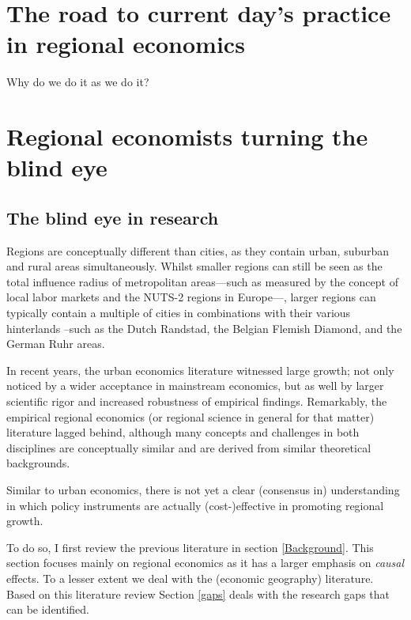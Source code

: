 \documentclass[fleqn,10pt]{SelfArx} %
\begin{document}

\section{The road to current day's practice in regional economics\label{Background}}

Why do we do it as we do it?


\section{Regional economists turning the blind eye\label{practices}}

\subsection{The blind eye in research}

Regions are conceptually different than cities, as they contain urban, suburban and rural areas simultaneously. Whilst smaller regions can still be seen as the total influence radius of metropolitan areas---such as measured by the concept of local labor markets and the NUTS-2 regions in Europe---, larger regions can typically contain a multiple of cities in combinations with their various hinterlands --such as the Dutch Randstad, the Belgian Flemish Diamond, and the German Ruhr areas. 

In recent years, the urban economics literature witnessed large growth; not only noticed by a wider acceptance in mainstream economics, but as well by larger scientific rigor and increased robustness of empirical findings. Remarkably, the empirical regional economics (or regional science in general for that matter) literature lagged behind, although many concepts and challenges in both disciplines are conceptually similar and are derived from similar theoretical backgrounds. 

Similar to urban economics, there is not yet a clear (consensus in) understanding in which policy instruments are actually (cost-)effective in promoting regional growth. 

To do so, I first review the previous literature in section \ref{Background}. This section focuses mainly on regional economics as it has a larger emphasis on \textit{causal} effects. To a lesser extent we deal with the (economic geography) literature. Based on this literature review Section \ref{gaps} deals with the research gaps that can be identified.
\end{document}
